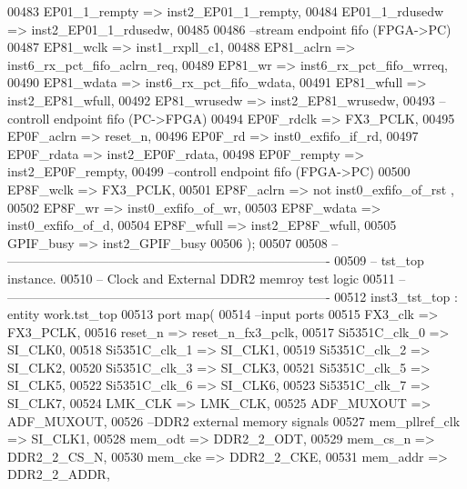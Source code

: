 \begin{DoxyCode}
00483       EP01\_1\_rempty        => inst2_EP01_1_rempty,
00484       EP01\_1\_rdusedw       => inst2_EP01_1_rdusedw, 
00485       
00486 \textcolor{keyword}{      --stream endpoint fifo (FPGA->PC)}
00487       EP81_wclk            => inst1_rxpll_c1,
00488       EP81_aclrn           => inst6_rx_pct_fifo_aclrn_req,
00489       EP81_wr              => inst6_rx_pct_fifo_wrreq,
00490       EP81_wdata           => inst6_rx_pct_fifo_wdata,
00491       EP81_wfull           => inst2_EP81_wfull,
00492       EP81_wrusedw         => inst2_EP81_wrusedw,
00493 \textcolor{keyword}{      --controll endpoint fifo (PC->FPGA)}
00494       EP0F_rdclk           => FX3_PCLK,
00495       EP0F\_aclrn           => reset_n,
00496       EP0F_rd              => inst0_exfifo_if_rd,
00497       EP0F_rdata           => inst2_EP0F_rdata,
00498       EP0F_rempty          => inst2_EP0F_rempty,
00499 \textcolor{keyword}{      --controll endpoint fifo (FPGA->PC)}
00500       EP8F_wclk            => FX3_PCLK,
00501       EP8F_aclrn           => \textcolor{keywordflow}{not} inst0\_exfifo\_of\_rst ,
00502       EP8F_wr              => inst0_exfifo_of_wr,
00503       EP8F_wdata           => inst0_exfifo_of_d,
00504       EP8F_wfull           => inst2_EP8F_wfull,
00505       GPIF_busy            => inst2_GPIF_busy
00506       \textcolor{vhdlchar}{)};
00507       
00508 \textcolor{keyword}{-- ----------------------------------------------------------------------------}
00509 \textcolor{keyword}{-- tst\_top instance.}
00510 \textcolor{keyword}{-- Clock and External DDR2 memroy test logic}
00511 \textcolor{keyword}{-- ----------------------------------------------------------------------------}
00512    inst3\_tst\_top : \textcolor{keywordflow}{entity} work.tst_top
00513    \textcolor{keywordflow}{port} \textcolor{keywordflow}{map}(
00514 \textcolor{keyword}{      --input ports }
00515       FX3_clk           => FX3_PCLK,
00516       reset_n           => reset_n_fx3_pclk,    
00517       Si5351C_clk_0     => SI_CLK0,
00518       Si5351C_clk_1     => SI_CLK1,
00519       Si5351C_clk_2     => SI_CLK2,
00520       Si5351C_clk_3     => SI_CLK3,
00521       Si5351C_clk_5     => SI_CLK5,
00522       Si5351C_clk_6     => SI_CLK6,
00523       Si5351C_clk_7     => SI_CLK7,
00524       LMK_CLK           => LMK_CLK,
00525       ADF_MUXOUT        => ADF_MUXOUT,    
00526 \textcolor{keyword}{      --DDR2 external memory signals}
00527       mem_pllref_clk    => SI_CLK1,
00528       mem_odt           => DDR2_2_ODT,
00529       mem_cs_n          => DDR2_2_CS_N,
00530       mem_cke           => DDR2_2_CKE,
00531       mem_addr          => DDR2_2_ADDR,

\end{DoxyCode}
